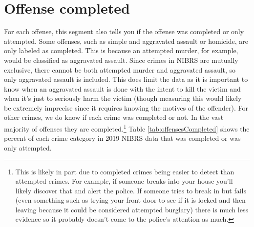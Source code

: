 \documentclass[
]{krantz}
\begin{document}
\section{Offense completed}\label{offense-completed}

For each offense, this segment also tells you if the offense
was completed or only attempted. Some offenses, such as
simple and aggravated assault or homicide, are only labeled
as completed. This is because an attempted murder, for
example, would be classified as aggravated assault. Since
crimes in NIBRS are mutually exclusive, there cannot be both
attempted murder and aggravated assault, so only aggravated
assault is included. This does limit the data as it is
important to know when an aggravated assault is done with
the intent to kill the victim and when it's just to
seriously harm the victim (though measuring this would
likely be extremely imprecise since it requires knowing the
motives of the offender). For other crimes, we do know if
each crime was completed or not. In the vast majority of
offenses they are completed.\footnote{This is likely in part
  due to completed crimes being easier to detect than
  attempted crimes. For example, if someone breaks into your
  house you'll likely discover that and alert the police. If
  someone tries to break in but fails (even something such
  as trying your front door to see if it is locked and then
  leaving because it could be considered attempted burglary)
  there is much less evidence so it probably doesn't come to
  the police's attention as much.} Table
\ref{tab:offensesCompleted} shows the percent of each crime
category in 2019 NIBRS data that was completed or was only
attempted.
\end{document}
